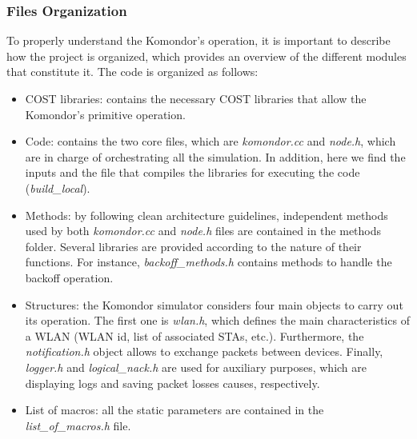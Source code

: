 \documentclass[a4paper]{article}
\begin{document}
		\subsubsection{Files Organization}
		\label{section:files}		
		To properly understand the Komondor's operation, it is important to describe how the project is organized, which provides an overview of the different modules that constitute it. The code is organized as follows:
		\begin{itemize}
			\item COST libraries: contains the necessary COST libraries that allow the Komondor's primitive operation. 
			\item Code: contains the two core files, which are \emph{komondor.cc} and \emph{node.h}, which are in charge of orchestrating all the simulation. In addition, here we find the inputs and the file that compiles the libraries for executing the code (\emph{build\_local}).
			\item Methods: by following clean architecture guidelines, independent methods used by both \emph{komondor.cc} and \emph{node.h} files are contained in the methods folder. Several libraries are provided according to the nature of their functions. For instance, \emph{backoff\_methods.h} contains methods to handle the backoff operation.
			\item Structures: the Komondor simulator considers four main objects to carry out its operation. The first one is \emph{wlan.h}, which defines the main characteristics of a WLAN (WLAN id, list of associated STAs, etc.). Furthermore, the \emph{notification.h} object allows to exchange packets between devices. Finally, \emph{logger.h} and \emph{logical\_nack.h} are used for auxiliary purposes, which are displaying logs and saving packet losses causes, respectively.
			\item List of macros: all the static parameters are contained in the \emph{list\_of\_macros.h} file. 			
		\end{itemize}
		
\end{document}
